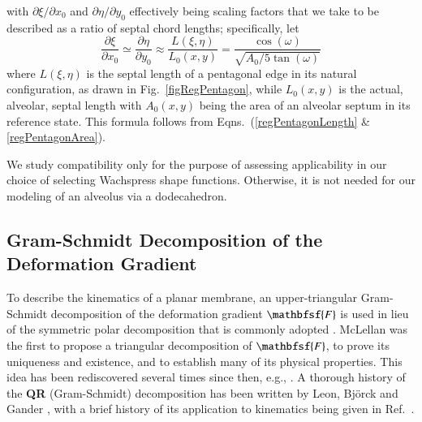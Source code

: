 with $\partial \xi / \partial x_0$ and $\partial \eta / \partial y_0$ effectively being scaling factors that we take to be described as a ratio of septal chord lengths; specifically, let
\begin{equation}
\frac{\partial \xi}{\partial x_0} \simeq
\frac{\partial \eta}{\partial y_0} \approx 
\frac{L(\xi, \eta)}{L_0 (x, y)} = 
\frac{\cos (\omega)}{\sqrt{A_0 / 5 \tan (\omega)}}
\end{equation}
where $L(\xi,\eta)$ is the septal length of a pentagonal edge in its natural configuration, as drawn in Fig.~\ref{figRegPentagon}, while $L_0(x,y)$ is the actual, alveolar, septal length with $A_0(x,y)$ being the area of an alveolar septum in its reference state.  This formula follows from Eqns.~(\ref{regPentagonLength} \& \ref{regPentagonArea}).

We study compatibility only for the purpose of assessing applicability in our choice of selecting Wachspress shape functions.  Otherwise, it is not needed for our modeling of an alveolus via a dodecahedron. 

\subsection{Gram-Schmidt Decomposition of the Deformation Gradient}
\label{secQR}

To describe the kinematics of a planar membrane, an upper-triangular Gram-Schmidt decomposition of the deformation gradient $\mathbfsf{F}$ is used in lieu of the symmetric polar decomposition that is commonly adopted \cite{Srinivasa12,FreedSrinivasa15,Freedetal17,FreedZamani19,Freedetal19}.  McLellan \cite{McLellan76,McLellan80} was the first to propose a triangular decomposition of $\mathbfsf{F}$, to prove its uniqueness and existence, and to establish many of its physical properties.  This idea has been rediscovered several times since then, e.g., \cite{Rosakis90,Souchet93,Srinivasa12}.  A thorough history of the \textbf{QR} (Gram-Schmidt) decomposition has been written by Leon, Bj\"orck and Gander \cite{Leonetal13}, with a brief history of its application to kinematics being given in Ref.~\cite{Freedetal19}.

